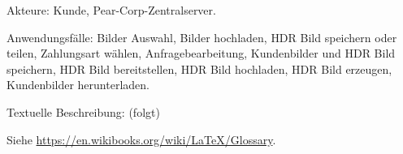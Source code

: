 \documentclass[parskip=full]{scrartcl}
\begin{document}
Akteure: Kunde, Pear-Corp-Zentralserver.

Anwendungsfälle: Bilder Auswahl, Bilder hochladen, \gls{HDR Bild} speichern oder teilen, Zahlungsart wählen, Anfragebearbeitung, Kundenbilder und \gls{HDR Bild} speichern, \gls{HDR Bild} bereitstellen, \gls{HDR Bild} hochladen, \gls{HDR Bild} erzeugen, Kundenbilder herunterladen.

Textuelle Beschreibung: (folgt)



%
%
\printnoidxglossaries
Siehe \url{https://en.wikibooks.org/wiki/LaTeX/Glossary}.
\end{document}
